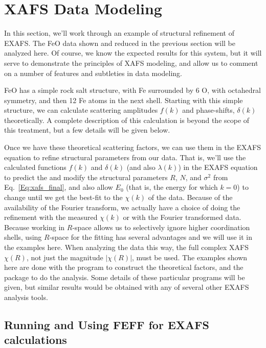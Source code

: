 \section{XAFS Data Modeling}\label{sect:modeling}

In this section, we'll work through an example of structural refinement of
EXAFS. The FeO data shown and reduced in the previous section will be
analyzed here.  Of course, we know the expected results for this system,
but it will serve to demonstrate the principles of XAFS modeling, and allow
us to comment on a number of features and subtleties in data modeling.

FeO has a simple rock salt structure, with Fe surrounded by 6 O, with
octahedral symmetry, and then 12 Fe atoms in the next shell.  Starting with
this simple structure, we can calculate scattering amplitudes $f(k)$ and
phase-shifts, $\delta(k)$ theoretically. A complete description of this
calculation is beyond the scope of this treatment, but a few details will be
given below.

Once we have these theoretical scattering factors, we can use them in the
EXAFS equation to refine structural parameters from our data.  That is,
we'll use the calculated functions $f(k)$ and $\delta(k)$ (and also
$\lambda(k)$) in the EXAFS equation to predict the and modify the
structural parameters $R$, $N$, and $\sigma^2$ from
Eq.~\ref{Eq:xafs_final}, and also allow $E_0$ (that is, the energy for
which $k=0$) to change until we get the best-fit to the $\chi(k)$ of the
data.  Because of the availability of the Fourier transform, we actually
have a choice of doing the refinement with the measured $\chi(k)$ or with
the Fourier transformed data.  Because working in $R$-space allows us to
selectively ignore higher coordination shells, using $R$-space for the
fitting has several advantages and we will use it in the examples here.
When analyzing the data this way, the full complex XAFS $\chi(R)$, not just
the magnitude $|\chi(R)|$, must be used.  The examples shown here are done
with the {\feff}\cite{feff6} program to construct the theoretical factors,
and the {\ifeffit}\cite{ifeffit} package to do the analysis.  Some details
of these particular programs will be given, but similar results would be
obtained with any of several other EXAFS analysis tools.

\subsection{Running and Using FEFF for EXAFS calculations}

